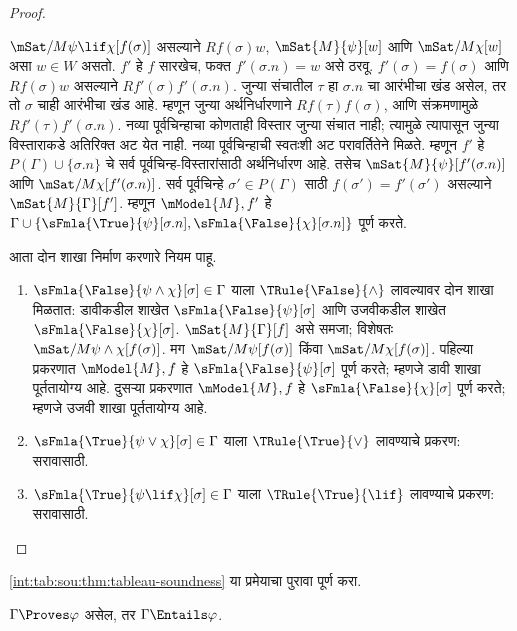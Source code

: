\begin{proof}
\begin{enumerate}
  $\mSat/{M}{\psi \lif \chi}[f(\sigma)]$
  असल्याने $Rf(\sigma)w$,
  $\mSat{M}{\psi}[w]$ आणि
  $\mSat/{M}{\chi}[w]$
  असा $w \in W$ असतो.
  $f'$ हे $f$ सारखेच, फक्त
  $f'(\sigma.n) = w$
  असे ठरवू. $f'(\sigma) = f(\sigma)$
  आणि $Rf(\sigma)w$ असल्याने $Rf'(\sigma)f'(\sigma.n)$.
  जुन्या संचातील $\tau$ हा $\sigma.n$ चा आरंभीचा खंड
  असेल, तर तो $\sigma$ चाही आरंभीचा खंड आहे.
  म्हणून जुन्या अर्थनिर्धारणाने $Rf(\tau)f(\sigma)$,
  आणि संक्रमणामुळे $Rf'(\tau)f'(\sigma.n)$.
  नव्या पूर्वचिन्हाचा कोणताही विस्तार जुन्या संचात नाही;
  त्यामुळे त्यापासून जुन्या विस्ताराकडे अतिरिक्त अट येत नाही.
  नव्या पूर्वचिन्हाची स्वतःशी अट परावर्तितेने मिळते.
  म्हणून $f'$ हे $P(\Gamma)\cup\{\sigma.n\}$ चे
  सर्व पूर्वचिन्ह-विस्तारांसाठी अर्थनिर्धारण आहे.
  तसेच $\mSat{M}{\psi}[f'(\sigma.n)]$
  आणि $\mSat/{M}{\chi}[f'(\sigma.n)]$.
  सर्व पूर्वचिन्हे
  $\sigma' \in P(\Gamma)$ साठी
  $f(\sigma') = f'(\sigma')$
  असल्याने
  $\mSat{M}{\Gamma}[f']$.
  म्हणून $\mModel{M}, f'$ हे
  $\Gamma \cup
  \{\sFmla{\True}{\psi}[\sigma.n],
  \sFmla{\False}{\chi}[\sigma.n]\}$
  पूर्ण करते.
\end{enumerate}
आता दोन शाखा निर्माण करणारे
नियम पाहू.
\begin{enumerate}
\item $\sFmla{\False}{\psi \land \chi}[\sigma] \in \Gamma$
  याला $\TRule{\False}{\land}$
  लावल्यावर दोन शाखा मिळतात:
  डावीकडील शाखेत
  $\sFmla{\False}{\psi}[\sigma]$
  आणि उजवीकडील शाखेत
  $\sFmla{\False}{\chi}[\sigma]$.
  $\mSat{M}{\Gamma}[f]$
  असे समजा; विशेषतः
  $\mSat/{M}{\psi \land \chi}[f(\sigma)]$.
  मग $\mSat/{M}{\psi}[f(\sigma)]$
  किंवा $\mSat/{M}{\chi}[f(\sigma)]$.
  पहिल्या प्रकरणात
  $\mModel{M}, f$ हे
  $\sFmla{\False}{\psi}[\sigma]$
  पूर्ण करते; म्हणजे डावी
  शाखा पूर्ततायोग्य आहे.
  दुसऱ्या प्रकरणात
  $\mModel{M}, f$ हे
  $\sFmla{\False}{\chi}[\sigma]$
  पूर्ण करते; म्हणजे उजवी
  शाखा पूर्ततायोग्य आहे.
\item $\sFmla{\True}{\psi \lor \chi}[\sigma] \in \Gamma$
  याला $\TRule{\True}{\lor}$
  लावण्याचे प्रकरण: सरावासाठी.
\item $\sFmla{\True}{\psi \lif \chi}[\sigma] \in \Gamma$
  याला $\TRule{\True}{\lif}$
  लावण्याचे प्रकरण: सरावासाठी.
\end{enumerate}
\end{proof}

\begin{prob}
\ref{int:tab:sou:thm:tableau-soundness}
या प्रमेयाचा पुरावा पूर्ण करा.
\end{prob}

\begin{cor}
\label{int:tab:sou:cor:entailment-soundness}
$\Gamma \Proves \varphi$ असेल,
तर $\Gamma \Entails \varphi$.
\end{cor}

